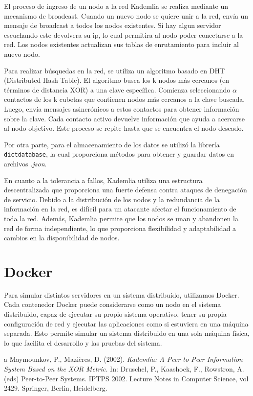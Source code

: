 \documentclass[10pt]{article} %
\begin{document}
	El proceso de ingreso de un nodo a la red Kademlia se realiza mediante un mecanismo de broadcast. Cuando un nuevo nodo se quiere unir a la red, envía un mensaje de broadcast a todos los nodos existentes. Si hay algun servidor escuchando este devolvera su ip, lo cual permitira al nodo poder conectarse a la red. Los nodos existentes actualizan sus tablas de enrutamiento para incluir al nuevo nodo.
	 
	Para realizar búsquedas en la red, se utiliza un algoritmo basado en DHT (Distributed Hash Table). El algoritmo busca los k nodos más cercanos (en términos de distancia XOR) a una clave específica. Comienza seleccionando $\alpha$ contactos de los k cubetas que contienen nodos más cercanos a la clave buscada. Luego, envía mensajes asincrónicos a estos contactos para obtener información sobre la clave. Cada contacto activo devuelve información que ayuda a acercarse al nodo objetivo. Este proceso se repite hasta que se encuentra el nodo deseado.	
	 
	 Por otra parte, para el almacenamiento de los datos se utiliz\'o la librer\'ia \texttt{dictdatabase}, la cual proporciona m\'etodos para obtener y guardar datos en archivos \textit{.json}.
		
	En cuanto a la tolerancia a fallos, Kademlia utiliza una estructura descentralizada que proporciona una fuerte defensa contra ataques de denegación de servicio. Debido a la distribución de los nodos y la redundancia de la información en la red, es difícil para un atacante afectar el funcionamiento de toda la red. Además, Kademlia permite que los nodos se unan y abandonen la red de forma independiente, lo que proporciona flexibilidad y adaptabilidad a cambios en la disponibilidad de nodos.
	
	
	
	\section{Docker}
	
	Para simular distintos servidores en un sistema distribuido, utilizamos Docker. Cada contenedor Docker puede considerarse como un nodo en el sistema distribuido, capaz de ejecutar su propio sistema operativo, tener su propia configuración de red y ejecutar las aplicaciones como si estuviera en una máquina separada. Esto permite simular un sistema distribuido en una sola máquina física, lo que facilita el desarrollo y las pruebas del sistema.
	

	
	\begin{thebibliography}
		a
		 Maymounkov, P., Mazières, D. (2002). \textit{Kademlia: A Peer-to-Peer Information System Based on the XOR Metric.} In: Druschel, P., Kaashoek, F., Rowstron, A. (eds) Peer-to-Peer Systems. IPTPS 2002. Lecture Notes in Computer Science, vol 2429. Springer, Berlin, Heidelberg.
	\end{thebibliography}
\end{document}
